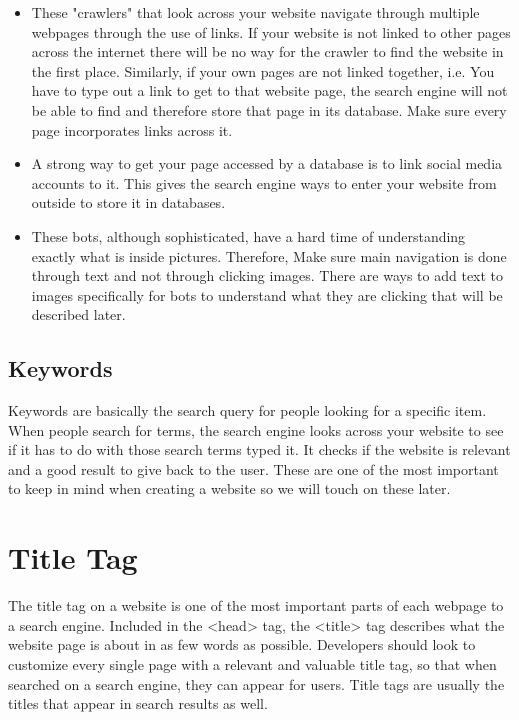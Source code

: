 \documentclass{article}
\begin{document}
\begin{itemize}
\item These "crawlers" that look across your website navigate through multiple webpages through the use of links. If your website is not linked to other pages across the internet there will be no way for the crawler to find the website in the first place. Similarly, if your own pages are not linked together, i.e. You have to type out a link to get to that website page, the search engine will not be able to find and therefore store that page in its database. Make sure every page incorporates links across it.
\item A strong way to get your page accessed by a database is to link social media accounts to it. This gives the search engine ways to enter your website from outside to store it in databases.
\item These bots, although sophisticated, have a hard time of understanding exactly what is inside pictures. Therefore, Make sure main navigation is done through text and not through clicking images. There are ways to add text to images specifically for bots to understand what they are clicking that will be described later.
\end{itemize}

\subsection{Keywords}
Keywords are basically the search query for people looking for a specific item. When people search for terms, the search engine looks across your website to see if it has to do with those search terms typed it. It checks if the website is relevant and a good result to give back to the user. These are one of the most important to keep in mind when creating a website so we will touch on these later. 

\section{Title Tag}
The title tag on a website is one of the most important parts of each webpage to a search engine. Included in the <head> tag, the <title> tag describes what the website page is about in as few words as possible. Developers should look to customize every single page with a relevant and valuable title tag, so that when searched on a search engine, they can appear for users. Title tags are usually the titles that appear in search results as well. 
\end{document}
